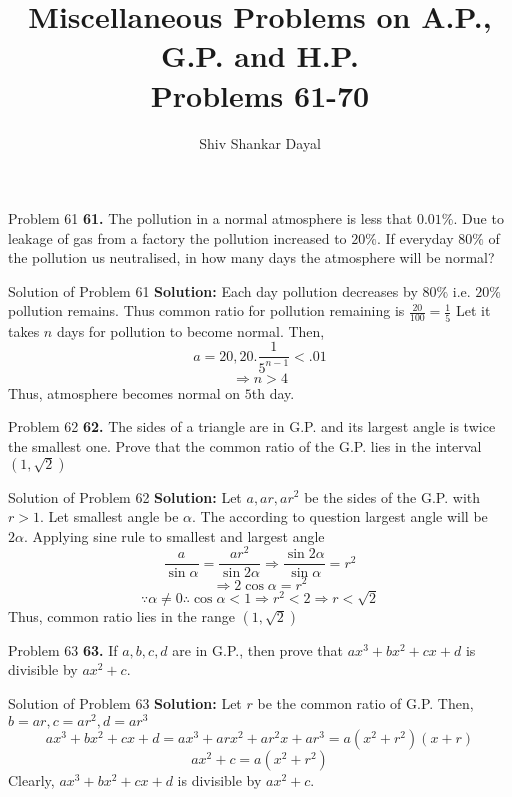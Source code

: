 \documentclass[aspectratio=1610,8pt]{beamer}
\title{Miscellaneous Problems on A.P., G.P. and H.P.\\Problems 61-70}
\author[Shiv Shankar Dayal]{Shiv Shankar Dayal}
\begin{document}
\begin{frame}
  \titlepage
\end{frame}
\begin{frame}{Problem 61}
  \textbf{61.} The pollution in a normal atmosphere is less that $0.01\%.$ Due to leakage of gas from a factory the pollution
  increased to $20\%.$ If everyday $80\%$ of the pollution us neutralised, in how many days the atmosphere will be normal?
\end{frame}
\begin{frame}{Solution of Problem 61}
  \textbf{Solution:} Each day pollution decreases by $80\%$ i.e. $20\%$ pollution remains. Thus common ratio for pollution
  remaining is $\frac{20}{100} = \frac{1}{5}$
  \linebreak\linebreak
  Let it takes $n$ days for pollution to become normal. Then,
  $$a = 20, 20.\frac{1}{5^{n - 1}} < .01$$
  $$\Rightarrow n > 4$$
  Thus, atmosphere becomes normal on $5$th day.
\end{frame}
\begin{frame}{Problem 62}
  \textbf{62.} The sides of a triangle are in G.P. and its largest angle is twice the smallest one. Prove that the common ratio of
  the G.P. lies in the interval $(1, \sqrt{2})$
\end{frame}
\begin{frame}{Solution of Problem 62}
  \textbf{Solution:} Let $a, ar, ar^2$ be the sides of the G.P. with $r > 1.$ Let smallest angle be $\alpha.$ The according to
  question largest angle will be $2\alpha.$ Applying sine rule to smallest and largest angle
  $$\frac{a}{\sin\alpha} = \frac{ar^2}{\sin2\alpha}\Rightarrow \frac{\sin2\alpha}{\sin\alpha} = r^2$$
  $$\Rightarrow 2\cos \alpha = r^2$$
  $$\because \alpha\neq 0 \therefore \cos\alpha < 1 \Rightarrow r^2 < 2 \Rightarrow r < \sqrt{2}$$
  Thus, common ratio lies in the range $(1, \sqrt{2})$
\end{frame}
\begin{frame}{Problem 63}
  \textbf{63.} If $a, b, c, d$ are in G.P., then prove that $ax^3 + bx^2 + cx + d$ is divisible by $ax^2 + c.$
\end{frame}
\begin{frame}{Solution of Problem 63}
  \textbf{Solution:} Let $r$ be the common ratio of G.P. Then, $b = ar, c = ar^2, d = ar^3$
  $$ax^3 + bx^2 + cx + d = ax^3 + arx^2 + ar^2x + ar^3 = a(x^2 + r^2)(x + r)$$
  $$ax^2 + c = a(x^2 + r^2)$$
  Clearly, $ax^3 + bx^2 + cx + d$ is divisible by $ax^2 + c.$
\end{frame}
\end{document}
